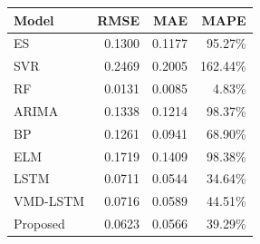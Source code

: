 {\tiny\setlength{\tabcolsep}{2pt}\begin{tabular}{lrrr} \toprule
Model & RMSE & MAE & MAPE \\ \midrule
ES & 0.1300 & 0.1177 & 95.27\% \\ 
SVR & 0.2469 & 0.2005 & 162.44\% \\ 
RF & 0.0131 & 0.0085 & 4.83\% \\ 
ARIMA & 0.1338 & 0.1214 & 98.37\% \\ 
BP & 0.1261 & 0.0941 & 68.90\% \\ 
ELM & 0.1719 & 0.1409 & 98.38\% \\ 
LSTM & 0.0711 & 0.0544 & 34.64\% \\ 
VMD-LSTM & 0.0716 & 0.0589 & 44.51\% \\ 
Proposed & 0.0623 & 0.0566 & 39.29\% \\ 
\bottomrule \end{tabular}}